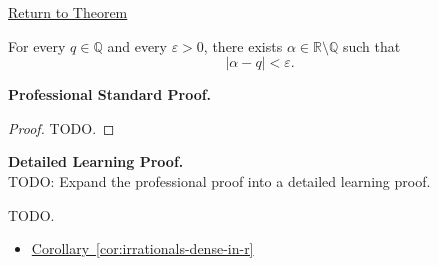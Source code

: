 \newpage
{}
\label{prf:every-rational-can-be-approximated-by-irrationals}

\begin{remark*}[Return]
\hyperref[cor:every-rational-can-be-approximated-by-irrationals]{Return to Theorem}
\end{remark*}

\begin{theorem*}
For every $q\in\mathbb{Q}$ and every $\varepsilon>0$, there exists
$\alpha\in\mathbb{R}\setminus\mathbb{Q}$ such that
\[
|\alpha-q|<\varepsilon.
\]
\end{theorem*}

\textbf{Professional Standard Proof.}~\\
\begin{proof}
TODO.
\end{proof}

\textbf{Detailed Learning Proof.}~\\
TODO: Expand the professional proof into a detailed learning proof.


\begin{remark*}
TODO.
\end{remark*}

\begin{dependencies}
\begin{itemize}
  \item \hyperref[cor:irrationals-dense-in-r]{Corollary~\ref*{cor:irrationals-dense-in-r}}
\end{itemize}
\end{dependencies}

